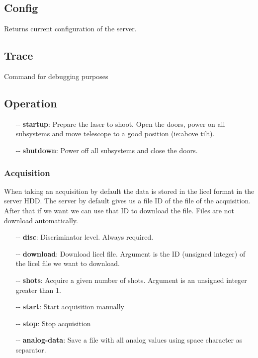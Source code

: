 \documentclass[letterpaper, 10 pt]{article}
\begin{document}
\subsection{Config}
Returns current configuration of the server.

\subsection{Trace}
Command for debugging purposes

\subsection{Operation} \label{operationcmds}
\begin{itemize}
	\item[-{}-] \textbf{startup}: Prepare the laser to shoot. Open the doors, power on all subsystems and move telescope to a good position (ie:above tilt).
	\item[-{}-] \textbf{shutdown}: Power off all subsystems and close the doors.
\end{itemize}
\subsubsection{Acquisition}
When taking an acquisition by default the data is stored in the licel format in the server HDD. The server by default gives us a file ID of the file of the acquisition. After that if we want we can use that ID to download the file. Files are not download automatically.
\begin{itemize}
	\item[-{}-] \textbf{disc}: Discriminator level. Always required.
	\item[-{}-] \textbf{download}: Download licel file. Argument is the ID (unsigned integer) of the licel file we want to download.
	\item[-{}-] \textbf{shots}: Acquire a given number of shots. Argument is an unsigned integer greater than 1. 
	\item[-{}-] \textbf{start}: Start acquisition manually
	\item[-{}-] \textbf{stop}: Stop acquisition
	\item[-{}-] \textbf{analog-data}: Save a file with all analog values using space character as separator.
\end{itemize}
\end{document}
